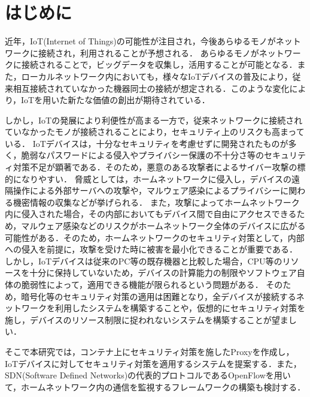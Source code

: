 \documentclass[Japanese]{dicomopapers}
\begin{document}
\section{はじめに}
近年，IoT(Internet of Things)の可能性が注目され，今後あらゆるモノがネットワークに接続され，利用されることが予想される．
あらゆるモノがネットワークに接続されることで，ビッグデータを収集し，活用することが可能となる．また，ローカルネットワーク内においても，様々なIoTデバイスの普及により，従来相互接続されていなかった機器同士の接続が想定される．このような変化により，IoTを用いた新たな価値の創出が期待されている．\par
しかし，IoTの発展により利便性が高まる一方で，従来ネットワークに接続されていなかったモノが接続されることにより，セキュリティ上のリスクも高まっている\cite{security}．
IoTデバイスは，十分なセキュリティを考慮せずに開発されたものが多く，脆弱なパスワードによる侵入やプライバシー保護の不十分さ等のセキュリティ対策不足が顕著である\cite{owasp}．そのため，悪意のある攻撃者によるサイバー攻撃の標的になりやすい．
脅威としては，ホームネットワークに侵入し，デバイスの遠隔操作による外部サーバへの攻撃や，マルウェア感染によるプライバシーに関わる機密情報の収集などが挙げられる．
また，攻撃によってホームネットワーク内に侵入された場合，その内部においてもデバイス間で自由にアクセスできるため，マルウェア感染などのリスクがホームネットワーク全体のデバイスに広がる可能性がある．そのため，ホームネットワークのセキュリティ対策として，内部への侵入を前提に，攻撃を受けた時に被害を最小化できることが重要である．
しかし，IoTデバイスは従来のPC等の既存機器と比較した場合，CPU等のリソースを十分に保持していない\cite{camera}ため，デバイスの計算能力の制限やソフトウェア自体の脆弱性によって，適用できる機能が限られるという問題がある\cite{disap}．
そのため，暗号化等のセキュリティ対策の適用は困難となり，全デバイスが接続するネットワークを利用したシステムを構築することや，仮想的にセキュリティ対策を施し，デバイスのリソース制限に捉われないシステムを構築することが望ましい．\par
そこで本研究では，コンテナ上にセキュリティ対策を施したProxyを作成し，IoTデバイスに対してセキュリティ対策を適用するシステムを提案する．また，SDN(Software Defined Networks)の代表的プロトコルであるOpenFlow\cite{openflow}を用いて，ホームネットワーク内の通信を監視するフレームワークの構築も検討する．
\end{document}
